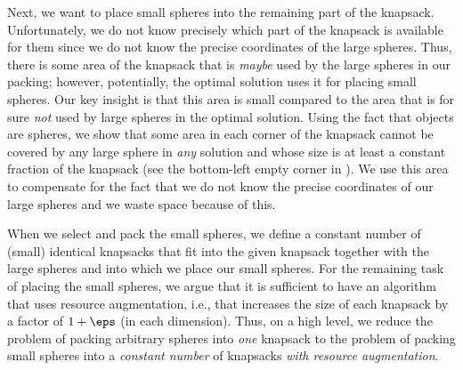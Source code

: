Next, we want to place small spheres into the remaining part of the
knapsack. Unfortunately, we do not know precisely which part of the
knapsack is available for them since we do not know the precise coordinates
of the large spheres. Thus, there is some area of the knapsack that
is \emph{maybe} used by the large spheres in our packing; however, potentially, the
optimal solution uses it for placing small spheres. Our key insight
is that this area is small compared to the area that is for
sure \emph{not} used by large spheres in the optimal solution. Using the
fact that objects are spheres, we show that some area in each corner
of the knapsack cannot be covered by any large sphere in \emph{any}
solution and whose size is at least a constant fraction of the knapsack
(see the bottom-left empty corner in ). We use this area to compensate for the fact that we
do not know the precise coordinates of our large spheres and we waste
space because of this.


When we select and pack the small spheres, we define a constant number
of (small) identical knapsacks that fit into the given knapsack together
with the large spheres and into which we place our small spheres.
For the remaining task of placing the small spheres, we argue that it is sufficient to have an algorithm
that uses resource augmentation, i.e., that increases the size of
each knapsack by a factor of $1+\eps$ (in each dimension).
Thus, on a high level, we reduce the problem of packing arbitrary spheres
into \emph{one} knapsack to the problem of packing small spheres into
a \emph{constant number} of knapsacks \emph{with resource augmentation}.


